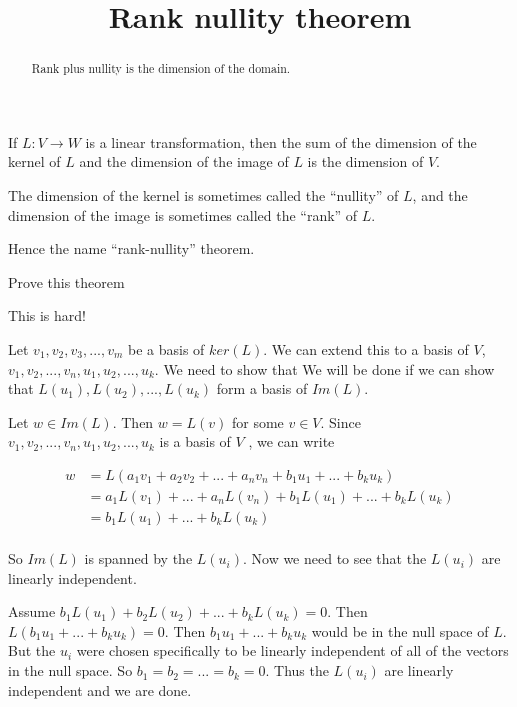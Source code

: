 \documentclass{ximera}
\title{Rank nullity theorem}
\begin{document}
\begin{abstract}
	Rank plus nullity is the dimension of the domain.
\end{abstract}\maketitle


\begin{theorem}
	If $L:V \to W$ is a linear transformation, then the sum of the dimension of the kernel of $L$ and the dimension of the image of $L$ is the dimension of $V$.
 \end{theorem}
 
 The dimension of the kernel is sometimes called the ``nullity'' of
 $L$, and the dimension of the image is sometimes called the ``rank''
 of $L$.

Hence the name ``rank-nullity'' theorem.
 
 Prove this theorem
 
 \begin{warning}
 This is hard!
 \end{warning}
 
 \begin{free-response}
 	Let $v_1,v_2,v_3,...,v_m$ be a basis of $ker(L)$.  We can extend this to a basis of $V$, $v_1,v_2,...,v_n,u_1,u_2,...,u_k$.  We need to show that 
 	We will be done if we can show that $L(u_1),L(u_2),...,L(u_k)$ form a basis of $Im(L)$.
 	
 	Let $w \in Im(L)$.  Then $w = L(v)$ for some $v \in V$.  Since $v_1,v_2,...,v_n,u_1,u_2,...,u_k$ is a basis of $V$ , we can write
 	
 	\begin{align*}
 		w &= L( a_1v_1+a_2v_2+...+a_nv_n+b_1u_1+...+b_ku_k)\\
 			&=a_1L(v_1)+...+a_nL(v_n)+b_1L(u_1)+...+b_kL(u_k)\\
 			&=b_1L(u_1)+...+b_kL(u_k)\\
 	\end{align*}
 	
 	So $Im(L)$ is spanned by the $L(u_i)$.  Now we need to see that the $L(u_i)$ are linearly independent.
 	
 	Assume $b_1L(u_1)+b_2L(u_2)+...+b_kL(u_k) = 0$.  Then $L(b_1u_1+...+b_ku_k) = 0$.  Then $b_1u_1+...+b_ku_k$ would be in the null space of $L$.  But
 	the $u_i$ were chosen specifically to be linearly independent of all of the vectors in the null space.  So $b_1=b_2=...=b_k = 0$.   Thus the $L(u_i)$ are linearly independent
 	and we are done.
 \end{free-response}
\end{document}
